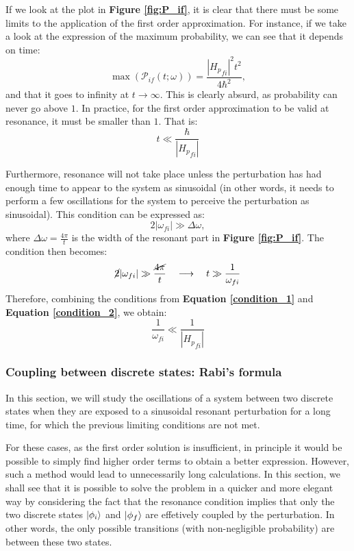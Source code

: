 If we look at the plot in \textbf{Figure \ref{fig:P_if}}, it is clear that there must be some limits to the application of the first order approximation. For instance, if we take a look at the expression of the maximum probability, we can see that it depends on time:
\begin{equation}
    \max \left(\mathcal{P}_{if}(t;\omega)\right) = \frac{\left|{H_p}_{fi}\right|^2t^2}{4\hbar^2},
\end{equation}
and that it goes to infinity at $t\to \infty$. This is clearly absurd, as probability can never go above $1$. In practice, for the first order approximation to be valid at resonance, it must be smaller than $1$. That is:
\begin{equation}\label{condition_1}
    t\ll\frac{\hbar }{\left|{H_p}_{fi}\right|}
\end{equation}

Furthermore, resonance will not take place unless the perturbation has had enough time to appear to the system as sinusoidal (in other words, it needs to perform a few oscillations for the system to perceive the perturbation as sinusoidal). This condition can  be expressed as:
\begin{equation}
    2|\omega_{fi}|\gg \Delta \omega,
\end{equation}
where $\Delta \omega = \frac{4\pi}{t}$ is the width of the resonant part in \textbf{Figure \ref{fig:P_if}}. The condition then becomes:
\begin{equation}\label{condition_2}
    \cancel{2}|\omega_{fi}|\gg \frac{\cancel{4\pi}}{t}\quad\longrightarrow\quad t \gg \frac{1}{\omega_{fi}}
\end{equation}
Therefore, combining the conditions from \textbf{Equation \ref{condition_1}} and \textbf{Equation \ref{condition_2}}, we obtain:
\begin{equation}
    \frac{1}{\omega_{fi}} \ll \frac{1}{\left|{H_p}_{fi}\right|}
\end{equation}

\subsubsection{Coupling between discrete states: Rabi's formula}

In this section, we will study the oscillations of a system between two discrete states when they are exposed to a sinusoidal resonant perturbation for a long time, for which the previous limiting conditions are not met. 

For these cases, as the first order solution is insufficient, in principle it would be possible to simply find higher order terms to obtain a better expression. However, such a method would lead to unnecessarily long calculations. In this section, we shall see that it is possible to solve the problem in a quicker and more elegant way by considering the fact that the resonance condition implies that only the two discrete states $\ket{\phi_i}$ and $\ket{\phi_f}$ are effetively coupled by the perturbation. In other words, the only possible transitions (with non-negligible probability) are between these two states. 

